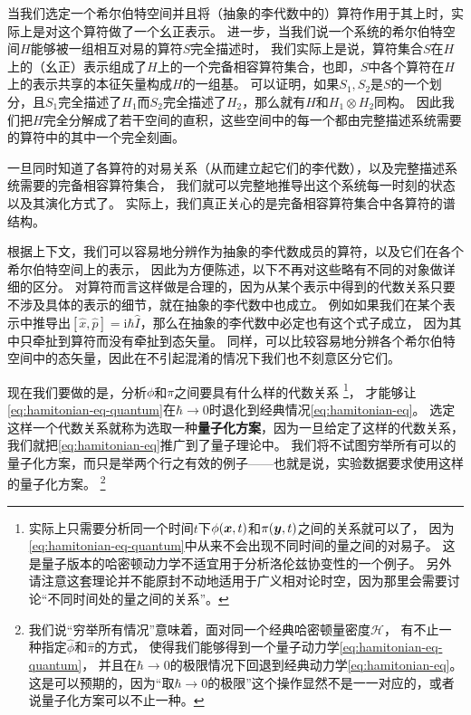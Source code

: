 \documentclass[hyperref, UTF8, a4paper]{ctexart}
\newcommand*{\ii}{\mathrm{i}}
\begin{document}
当我们选定一个希尔伯特空间并且将（抽象的李代数中的）算符作用于其上时，实际上是对这个算符做了一个幺正表示。
进一步，当我们说一个系统的希尔伯特空间$H$能够被一组相互对易的算符$S$完全描述时，
我们实际上是说，算符集合$S$在$H$上的（幺正）表示组成了$H$上的一个完备相容算符集合，也即，$S$中各个算符在$H$上的表示共享的本征矢量构成$H$的一组基。
可以证明，如果$S_1,S_2$是$S$的一个划分，且$S_1$完全描述了$H_1$而$S_2$完全描述了$H_2$，那么就有$H$和$H_1 \otimes H_2$同构。
因此我们把$H$完全分解成了若干空间的直积，这些空间中的每一个都由完整描述系统需要的算符中的其中一个完全刻画。

一旦同时知道了各算符的对易关系（从而建立起它们的李代数），以及完整描述系统需要的完备相容算符集合，
我们就可以完整地推导出这个系统每一时刻的状态以及其演化方式了。
实际上，我们真正关心的是完备相容算符集合中各算符的谱结构。

根据上下文，我们可以容易地分辨作为抽象的李代数成员的算符，以及它们在各个希尔伯特空间上的表示，
因此为方便陈述，以下不再对这些略有不同的对象做详细的区分。
对算符而言这样做是合理的，因为从某个表示中得到的代数关系只要不涉及具体的表示的细节，就在抽象的李代数中也成立。
例如如果我们在某个表示中推导出$[\hat{x}, \hat{p}] = \ii \hbar \hat{I}$，那么在抽象的李代数中必定也有这个式子成立，
因为其中只牵扯到算符而没有牵扯到态矢量。
同样，可以比较容易地分辨各个希尔伯特空间中的态矢量，因此在不引起混淆的情况下我们也不刻意区分它们。

现在我们要做的是，分析$\phi$和$\pi$之间要具有什么样的代数关系%
\footnote{实际上只需要分析同一个时间$t$下$\phi(\vb*{x}, t)$和$\pi(\vb*{y}, t)$之间的关系就可以了，
因为\eqref{eq:hamitonian-eq-quantum}中从来不会出现不同时间的量之间的对易子。
这是量子版本的哈密顿动力学不适宜用于分析洛伦兹协变性的一个例子。
另外请注意这套理论并不能原封不动地适用于广义相对论时空，因为那里会需要讨论“不同时间处的量之间的关系”。}，
才能够让\eqref{eq:hamitonian-eq-quantum}在$\hbar \to 0$时退化到经典情况\eqref{eq:hamitonian-eq}。
选定这样一个代数关系就称为选取一种\textbf{量子化方案}，因为一旦给定了这样的代数关系，我们就把\eqref{eq:hamitonian-eq}推广到了量子理论中。
我们将不试图穷举所有可以的量子化方案，而只是举两个行之有效的例子——也就是说，实验数据要求使用这样的量子化方案。%
\footnote{我们说“穷举所有情况”意味着，面对同一个经典哈密顿量密度$\mathcal{H}$，
有不止一种指定$\hat{\phi}$和$\hat{\pi}$的方式，
使得我们能够得到一个量子动力学\eqref{eq:hamitonian-eq-quantum}，
并且在$\hbar \to 0$的极限情况下回退到经典动力学\eqref{eq:hamitonian-eq}。
这是可以预期的，因为“取$\hbar\to 0$的极限”这个操作显然不是一一对应的，或者说量子化方案可以不止一种。
}
\end{document}
